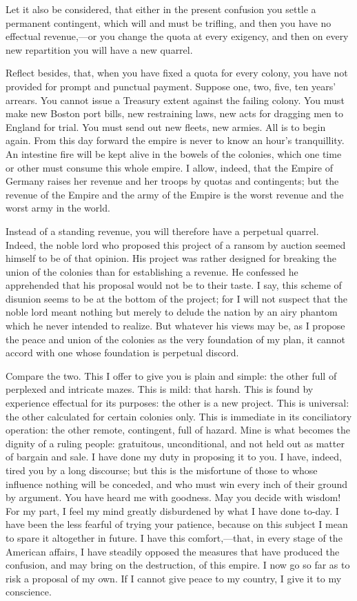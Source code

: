 Let it also be considered, that either in the present confusion you settle a permanent contingent, which will and must be trifling, and then you have no effectual revenue,—or you change the quota at every exigency, and then on every new repartition you will have a new quarrel.

Reflect besides, that, when you have fixed a quota for every colony, you have not provided for prompt and punctual payment. Suppose one, two, five, ten years' arrears. You cannot issue a Treasury extent against the failing colony. You must make new Boston port bills, new restraining laws, new acts for dragging men to England for trial. You must send out new fleets, new armies. All is to begin again. From this day forward the empire is never to know an hour's tranquillity. An intestine fire will be kept alive in the bowels of the colonies, which one time or other must consume this whole empire. I allow, indeed, that the Empire of Germany raises her revenue and her troops by quotas and contingents; but the revenue of the Empire and the army of the Empire is the worst revenue and the worst army in the world.

Instead of a standing revenue, you will therefore have a perpetual quarrel. Indeed, the noble lord who proposed this project of a ransom by auction seemed himself to be of that opinion. His project was rather designed for breaking the union of the colonies than for establishing a revenue. He confessed he apprehended that his proposal would not be to their taste. I say, this scheme of disunion seems to be at the bottom of the project; for I will not suspect that the noble lord meant nothing but merely to delude the nation by an airy phantom which he never intended to realize. But whatever his views may be, as I propose the peace and union of the colonies as the very foundation of my plan, it cannot accord with one whose foundation is perpetual discord.

Compare the two. This I offer to give you is plain and simple: the other full of perplexed and intricate mazes. This is mild: that harsh. This is found by experience effectual for its purposes: the other is a new project. This is universal: the other calculated for certain colonies only. This is immediate in its conciliatory operation: the other remote, contingent, full of hazard. Mine is what becomes the dignity of a ruling people: gratuitous, unconditional, and not held out as matter of bargain and sale. I have done my duty in proposing it to you. I have, indeed, tired you by a long discourse; but this is the misfortune of those to whose influence nothing will be conceded, and who must win every inch of their ground by argument. You have heard me with goodness. May you decide with wisdom! For my part, I feel my mind greatly disburdened by what I have done to-day. I have been the less fearful of trying your patience, because on this subject I mean to spare it altogether in future. I have this comfort,—that, in every stage of the American affairs, I have steadily opposed the measures that have produced the confusion, and may bring on the destruction, of this empire. I now go so far as to risk a proposal of my own. If I cannot give peace to my country, I give it to my conscience.

